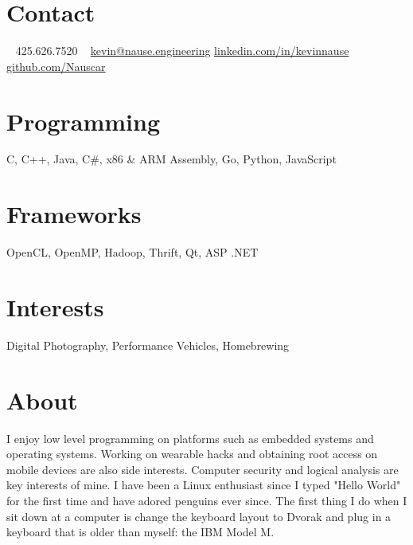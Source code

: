\documentclass[print]{friggeri-cv} %
\begin{document}


\begin{aside} %
\section{Contact}
~
425.626.7520
~
{\scriptsize \href{mailto:kevin@nause.engineering}{kevin@nause.engineering}}
{\scriptsize \href{https://linkedin.com/in/kevinnause}{linkedin.com/in/kevinnause}}
{\scriptsize \href{https://github.com/Nauscar}{github.com/Nauscar}}
\section{Programming}
C, C++, Java, C\#, 
x86 \& ARM Assembly, 
Go, Python, JavaScript
\section{Frameworks}
OpenCL, OpenMP,
Hadoop, Thrift, 
Qt, ASP .NET
\section{Interests}
{Digital Photography, Performance Vehicles, Homebrewing}
\section{About}
{I enjoy low level programming on platforms such as embedded systems and operating systems.
Working on wearable hacks and obtaining root access on mobile devices are also side interests. 
Computer security and logical analysis are key interests of mine. 
I have been a Linux enthusiast since I typed "Hello World" for the first time and have adored penguins ever since. 
The first thing I do when I sit down at a computer is change the keyboard layout to Dvorak and plug in a keyboard that is older than myself: the IBM Model M.}
\end{aside}

\end{document}
